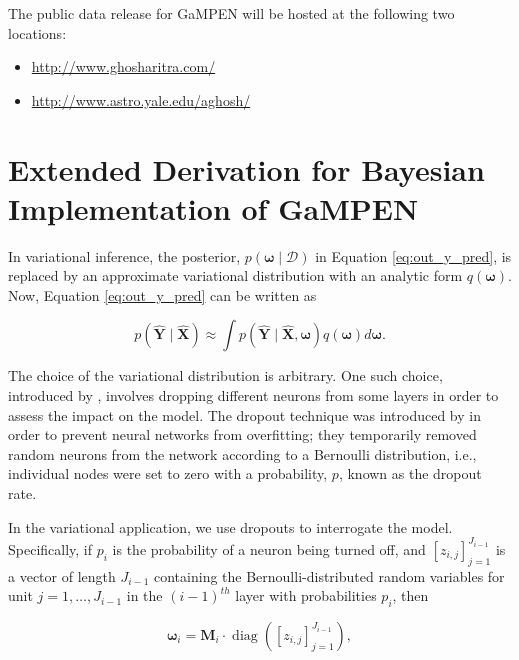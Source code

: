 \documentclass[twocolumn]{aastex63}
\newcommand\gampen{GaMPEN}
\begin{document}
\begin{CJK*}{UTF8}{gbsn}
\vspace{10pt}
The public data release for \gampen{} will be hosted at the following two locations:

\begin{itemize}
    \item \href{http://www.ghosharitra.com/}{http://www.ghosharitra.com/}
    \item \href{http://www.astro.yale.edu/aghosh/}{http://www.astro.yale.edu/aghosh/}
\end{itemize}


\section{Extended Derivation for Bayesian Implementation of \gampen{}} \label{sec:ap:mcd_deri}

In variational inference, the posterior, $p(\boldsymbol{\omega} \mid \mathcal{D})$ in Equation \ref{eq:out_y_pred}, is replaced by an approximate variational distribution with an analytic form $q(\boldsymbol{\omega})$. Now, Equation \ref{eq:out_y_pred} can be written as

\begin{equation}
p(\boldsymbol{\hat{Y}} \mid \boldsymbol{\hat{X}}) \approx \int p(\boldsymbol{\hat{Y}} \mid \boldsymbol{\hat{X}}, \boldsymbol{\omega}) q(\boldsymbol{\omega}) d \boldsymbol{\omega} .
\label{eq:out_y_pred_vi}
\end{equation}

The choice of the variational distribution is arbitrary. 
One such choice, introduced by \cite{gal_2016}, involves dropping different neurons from some layers in order to assess the impact on the model. 
The dropout technique was introduced by \cite{Srivastava2014Dropout:Overfitting} in order to prevent neural networks from overfitting; they temporarily removed random neurons from the network according to a Bernoulli distribution, i.e., individual nodes were set to zero with a probability, $p$, known as the dropout rate. 

In the variational application, we use dropouts to interrogate the model. 
Specifically, 
if $p_{i}$ is the probability of a neuron being turned off, and
$\left[z_{i, j}\right]_{j=1}^{J_{i-1}}$ is a vector of length $J_{i-1}$ containing the Bernoulli-distributed random variables for unit $j=1, \ldots, J_{i-1}$ in the $(i-1)^{th}$ layer with probabilities $p_i$, then

\begin{equation}
\boldsymbol{\omega}_{i} =\boldsymbol{M}_{i} \cdot \operatorname{diag}\left(\left[z_{i, j}\right]_{j=1}^{J_{i-1}}\right) ,
\label{eq:bernoulli}
\end{equation}


\end{CJK*}
\end{document}
